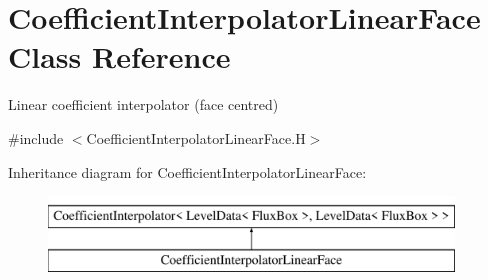 \hypertarget{class_coefficient_interpolator_linear_face}{}\section{Coefficient\+Interpolator\+Linear\+Face Class Reference}
\label{class_coefficient_interpolator_linear_face}


Linear coefficient interpolator (face centred)  




{\ttfamily \#include $<$Coefficient\+Interpolator\+Linear\+Face.\+H$>$}

Inheritance diagram for Coefficient\+Interpolator\+Linear\+Face\+:\begin{figure}[H]
\begin{center}
\leavevmode
\includegraphics[height=2.000000cm]{class_coefficient_interpolator_linear_face}
\end{center}
\end{figure}
